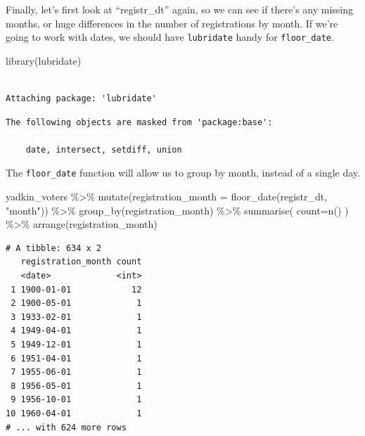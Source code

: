 \documentclass[
  letterpaper,
  DIV=11,
  numbers=noendperiod]{scrreprt}
\newenvironment{Shaded}{\begin{snugshade}}{\end{snugshade}}
\newcommand{\AttributeTok}[1]{\textcolor[rgb]{0.40,0.45,0.13}{#1}}
\newcommand{\FunctionTok}[1]{\textcolor[rgb]{0.28,0.35,0.67}{#1}}
\newcommand{\NormalTok}[1]{\textcolor[rgb]{0.00,0.23,0.31}{#1}}
\newcommand{\SpecialCharTok}[1]{\textcolor[rgb]{0.37,0.37,0.37}{#1}}
\newcommand{\StringTok}[1]{\textcolor[rgb]{0.13,0.47,0.30}{#1}}
\begin{document}
Finally, let's first look at ``registr\_dt'' again, so we can see if
there's any missing months, or huge differences in the number of
registrations by month. If we're going to work with dates, we should
have \texttt{lubridate} handy for \texttt{floor\_date}.

\begin{Shaded}
\begin{Highlighting}[]
\FunctionTok{library}\NormalTok{(lubridate)}
\end{Highlighting}
\end{Shaded}

\begin{verbatim}

Attaching package: 'lubridate'
\end{verbatim}

\begin{verbatim}
The following objects are masked from 'package:base':

    date, intersect, setdiff, union
\end{verbatim}

The \texttt{floor\_date} function will allow us to group by month,
instead of a single day.

\begin{Shaded}
\begin{Highlighting}[]
\NormalTok{yadkin\_voters }\SpecialCharTok{\%\textgreater{}\%} 
  \FunctionTok{mutate}\NormalTok{(}\AttributeTok{registration\_month =} \FunctionTok{floor\_date}\NormalTok{(registr\_dt, }\StringTok{"month"}\NormalTok{)) }\SpecialCharTok{\%\textgreater{}\%}
  \FunctionTok{group\_by}\NormalTok{(registration\_month) }\SpecialCharTok{\%\textgreater{}\%} 
   \FunctionTok{summarise}\NormalTok{(}
    \AttributeTok{count=}\FunctionTok{n}\NormalTok{()}
\NormalTok{  ) }\SpecialCharTok{\%\textgreater{}\%}
  \FunctionTok{arrange}\NormalTok{(registration\_month)}
\end{Highlighting}
\end{Shaded}

\begin{verbatim}
# A tibble: 634 x 2
   registration_month count
   <date>             <int>
 1 1900-01-01            12
 2 1900-05-01             1
 3 1933-02-01             1
 4 1949-04-01             1
 5 1949-12-01             1
 6 1951-04-01             1
 7 1955-06-01             1
 8 1956-05-01             1
 9 1956-10-01             1
10 1960-04-01             1
# ... with 624 more rows
\end{verbatim}
\end{document}
